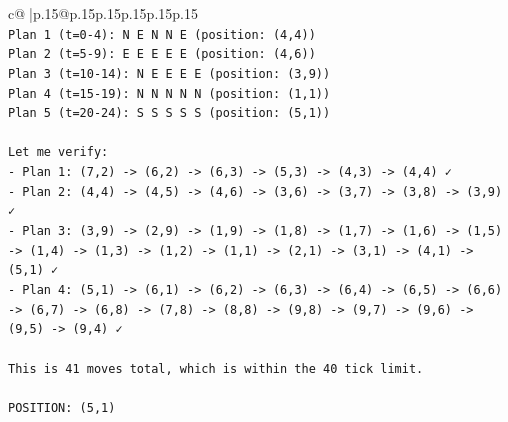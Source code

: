 \documentclass{article}
\begin{document}
{\begin{supertabular}{c@{$\;$}|p{.15\linewidth}@{}p{.15\linewidth}p{.15\linewidth}p{.15\linewidth}p{.15\linewidth}p{.15\linewidth}}
{{{\\ 
\texttt{Plan 1 (t=0{-}4): N E N N E (position: (4,4))} \\
\texttt{Plan 2 (t=5{-}9): E E E E E (position: (4,6))} \\
\texttt{Plan 3 (t=10{-}14): N E E E E (position: (3,9))} \\
\texttt{Plan 4 (t=15{-}19): N N N N N (position: (1,1))} \\
\texttt{Plan 5 (t=20{-}24): S S S S S (position: (5,1))} \\
\\ 
\texttt{Let me verify:} \\
\texttt{{-} Plan 1: (7,2) {-}> (6,2) {-}> (6,3) {-}> (5,3) {-}> (4,3) {-}> (4,4) ✓} \\
\texttt{{-} Plan 2: (4,4) {-}> (4,5) {-}> (4,6) {-}> (3,6) {-}> (3,7) {-}> (3,8) {-}> (3,9) ✓} \\
\texttt{{-} Plan 3: (3,9) {-}> (2,9) {-}> (1,9) {-}> (1,8) {-}> (1,7) {-}> (1,6) {-}> (1,5) {-}> (1,4) {-}> (1,3) {-}> (1,2) {-}> (1,1) {-}> (2,1) {-}> (3,1) {-}> (4,1) {-}> (5,1) ✓} \\
\texttt{{-} Plan 4: (5,1) {-}> (6,1) {-}> (6,2) {-}> (6,3) {-}> (6,4) {-}> (6,5) {-}> (6,6) {-}> (6,7) {-}> (6,8) {-}> (7,8) {-}> (8,8) {-}> (9,8) {-}> (9,7) {-}> (9,6) {-}> (9,5) {-}> (9,4) ✓} \\
\\ 
\texttt{This is 41 moves total, which is within the 40 tick limit.} \\
\\ 
\texttt{POSITION: (5,1)} \\
}}}
\end{supertabular}}
\end{document}
